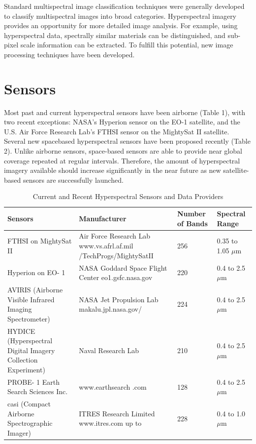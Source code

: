 \documentclass[document.tex]{subfiles}
\begin{document}
Standard multispectral image classification techniques were generally developed to
classify multispectral images into broad categories. Hyperspectral imagery provides an
opportunity for more detailed image analysis. For example, using hyperspectral data,
spectrally similar materials can be distinguished, and sub-pixel scale information can be extracted. To fulfill this potential, new image processing techniques have been
developed.
\section{Sensors}
Most past and current hyperspectral sensors have been airborne (Table 1), with two
recent exceptions: NASA’s Hyperion sensor on the EO-1 satellite, and the U.S. Air
Force Research Lab’s FTHSI sensor on the MightySat II satellite. Several new spacebased
hyperspectral sensors have been proposed recently (Table 2). Unlike airborne
sensors, space-based sensors are able to provide near global coverage repeated at regular
intervals. Therefore, the amount of hyperspectral imagery available should increase
significantly in the near future as new satellite-based sensors are successfully launched.
\begin{table}[H]
	\caption{Current and Recent Hyperspectral Sensors and Data Providers}
	\begin{center}
		\begin{tabularx}{\columnwidth}{|X|X|X|X|}
			\hline
			Sensors & Manufacturer & Number of
			Bands &
			Spectral Range\\ \hline
			FTHSI on
			MightySat
			II &
			Air Force Research
			Lab www.vs.afrl.af.mil
			/TechProgs/MightySatII &
			256  & 0.35 to 1.05 $\mu$m \\ \hline
			Hyperion
			on EO- 1 &
			NASA Goddard
			Space Flight Center
			eo1.gsfc.nasa.gov &
			220 & 0.4 to 2.5 $\mu$m\\ \hline
			AVIRIS
			(Airborne
			Visible
			Infrared
			Imaging
			Spectrometer) &
			NASA Jet
			Propulsion Lab
			makalu.jpl.nasa.gov/ &
			224 & 0.4 to 2.5 $\mu$m\\ \hline
			HYDICE
			(Hyperspectral
			Digital
			Imagery
			Collection
			Experiment) &
			Naval Research Lab & 210 & 0.4 to 2.5 $\mu$m \\ \hline
			PROBE-
			1 Earth
			Search
			Sciences
			Inc. &
			www.earthsearch .com & 128 & 0.4 to 2.5 $\mu$m\\ \hline
			
			casi (Compact
			Airborne
			Spectrographic
			Imager) &
			ITRES Research Limited
			www.itres.com
			up to  & 228 & 0.4 to 1.0$\mu$m\\ \hline
		\end{tabularx}
	\end{center}
	\label{tab:Current and Recent Hyperspectral Sensors and Data Providers}
\end{table}
\end{document}
